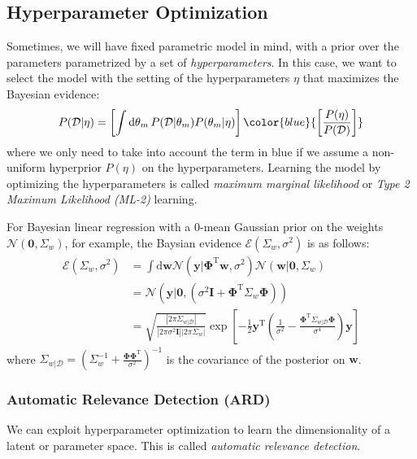 \documentclass[a4paper]{article}
\begin{document}
\subsection{Hyperparameter Optimization}
Sometimes, we will have fixed parametric model in mind, with a prior over the parameters parametrized by a set of \emph{hyperparameters}. In this case, we want to select the model with the setting of the hyperparameters $\eta$ that maximizes the Bayesian evidence:
\[ P(\mathcal{D}|\eta) = \left[\int\textrm{d}\theta_m\, P(\mathcal{D}|\theta_m)P(\theta_m|\eta)\right]\color{blue}{\left[\frac{P(\eta)}{P(\mathcal{D})}\right]} \]
where we only need to take into account the term in blue if we assume a non-uniform hyperprior $P(\eta)$ on the hyperparameters. Learning the model by optimizing the hyperparameters is called \emph{maximum marginal likelihood} or \emph{Type 2 Maximum Likelihood (ML-2)} learning.

For Bayesian linear regression with a 0-mean Gaussian prior on the weights $\mathcal{N}(\mathbf{0},\Sigma_w)$, for example, the Baysian evidence $\mathcal{E}(\Sigma_w,\sigma^2)$ is as follows:
\begin{align*}
\mathcal{E}(\Sigma_w,\sigma^2) &= \int \textrm{d}\mathbf{w} \mathcal{N}(\mathbf{y}|\mathbf{\Phi}^\textrm{T}\mathbf{w},\sigma^2) \mathcal{N}(\mathbf{w}|\mathbf{0},\Sigma_w) \\
&= \mathcal{N}(\mathbf{y}|\mathbf{0},(\sigma^2 \mathbf{I} + \mathbf{\Phi}^\textrm{T}\Sigma_w \mathbf{\Phi})) \\
&= \sqrt{\frac{|2\pi\Sigma_{w|\mathcal{D}}|}{|2\pi \sigma^2 \mathbf{I}||2\pi\Sigma_w|}}\exp\left[-\frac{1}{2} \mathbf{y}^\textrm{T}\left( \frac{1}{\sigma^2} - \frac{\mathbf{\Phi}^\textrm{T}\Sigma_{w|\mathcal{D}}\mathbf{\Phi}}{\sigma^4} \right)\mathbf{y}\right]
\end{align*}
where $\Sigma_{w|\mathcal{D}} = \left(\Sigma_w^{-1} + \frac{\mathbf{\Phi\Phi}^\textrm{T}}{\sigma^2} \right)^{-1}$ is the covariance of the posterior on $\mathbf{w}$.

\subsubsection{Automatic Relevance Detection (ARD)} \label{ard}
We can exploit hyperparameter optimization to learn the dimensionality of a latent or parameter space. This is called \emph{automatic relevance detection}.
\end{document}
